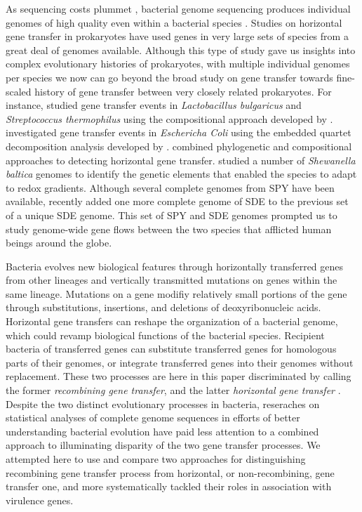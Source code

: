 \documentclass[english]{article}
\begin{document}
As sequencing costs plummet \citep{Mardis2011}, bacterial genome sequencing
produces individual genomes of high quality even within a bacterial species
\citep{Tettelin2009a}.  Studies on horizontal gene transfer in prokaryotes have
used genes in very large sets of species \citep{Koonin2001} from a great deal
of genomes available.  Although this type of study gave us insights into complex
evolutionary histories of prokaryotes, with multiple individual genomes per
species we now can go beyond the broad study on gene transfer towards
fine-scaled history of gene transfer between very closely related prokaryotes.
For instance, \citet{Liu2009} studied gene transfer events in
\textit{Lactobacillus bulgaricus} and \textit{Streptococcus thermophilus} using
the compositional approach developed by \citet{Karlin2001}. \citet{Luo2011}
investigated gene transfer events in \textit{Eschericha Coli} using the embedded
quartet decomposition analysis developed by \citet{Zhaxybayeva2006}.
\citet{Hamady2006} combined phylogenetic and compositional approaches to
detecting horizontal gene transfer.  \citet{Caro-Quintero2011} studied a number
of \textit{Shewanella baltica} genomes to identify the genetic elements that
enabled the species to adapt to redox gradients.  Although several complete
genomes from SPY have been available, \citet{Suzuki2011} recently added one more
complete genome of SDE to the previous set of a unique SDE genome. This set of
SPY and SDE genomes prompted us to study genome-wide gene flows between the two
species that afflicted human beings around the globe.

Bacteria evolves new biological features through horizontally transferred genes
from other lineages and vertically transmitted mutations on genes within
the same lineage.  Mutations on a gene modifiy relatively small portions of the
gene through substitutions, insertions, and deletions of deoxyribonucleic
acids. Horizontal gene transfers can reshape the organization of a bacterial
genome, which could revamp biological functions of the bacterial species.
Recipient bacteria of transferred genes can substitute transferred genes for homologous parts of
their genomes, or integrate transferred genes into their genomes
without replacement. These two processes are here in this paper discriminated by calling the
former \textit{recombining gene transfer}, and the latter \textit{horizontal
gene transfer} \citep{Ochman2001,Lawrence2009}.  Despite the two distinct
evolutionary processes in bacteria, reseraches on statistical analyses of
complete genome sequences in efforts of better understanding bacterial evolution
have paid less attention to a combined approach to illuminating disparity of
the two gene transfer processes. We attempted here to use and compare two
approaches for distinguishing recombining gene transfer process from horizontal, or
non-recombining, gene transfer one, and more systematically tackled their roles
in association with virulence genes.
\end{document}
